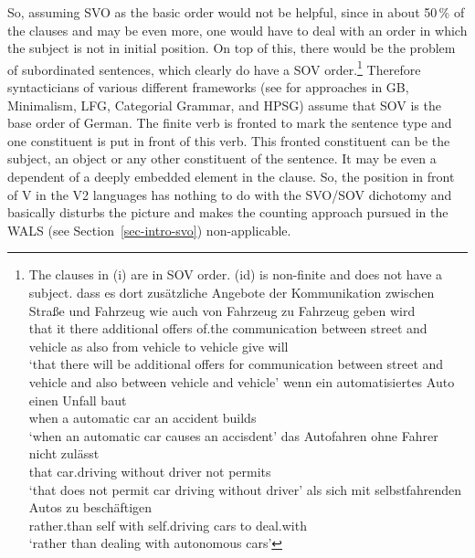 So, assuming
SVO as the basic order would not be helpful, since in about 50\,\% of the clauses and may be even
more, one would have to deal with an order in which the subject is not in initial position. On top of
this, there would be the problem of subordinated sentences, which clearly do have a SOV
order.\footnote{
The clauses in (i) are in SOV order. (id) is non-finite and does not have a subject.
\eal
\ex 
\gll dass es dort zusätzliche Angebote der Kommunikation zwischen Straße und Fahrzeug wie auch von Fahrzeug zu Fahrzeug geben wird\\
     that it there additional offers   of.the communication between street and vehicle as also from vehicle to vehicle give will\\
\glt `that there will be additional offers for communication between street and vehicle and also
between vehicle and vehicle'
\ex 
\gll wenn ein automatisiertes Auto einen Unfall baut\\
     when a   automatic       car  an accident  builds\\
\glt `when an automatic car causes an accisdent'
\ex 
\gll das Autofahren ohne Fahrer nicht zulässt\\
     that car.driving without driver not permits\\
\glt `that does not permit car driving without driver'
\ex
\gll als sich mit selbstfahrenden Autos zu beschäftigen\\
     rather.than self with self.driving cars to deal.with\\
\glt `rather than dealing with autonomous cars'
\zllast
}
 Therefore syntacticians of various different frameworks (see \citealp{MuellerGT-Eng4} for
approaches in GB, Minimalism, LFG, Categorial Grammar, and HPSG) assume that SOV is the base order of
German. The finite verb is fronted to mark the sentence type and one constituent is put in front of
this verb. This fronted constituent can be the subject, an object or any other constituent of the
sentence. It may be even a dependent of a deeply embedded element in the clause. So, the position
in front of V in the V2 languages has nothing to do with the SVO/SOV dichotomy and basically disturbs
the picture and makes the counting approach pursued in the WALS (see Section~\ref{sec-intro-svo})
non-applicable.

